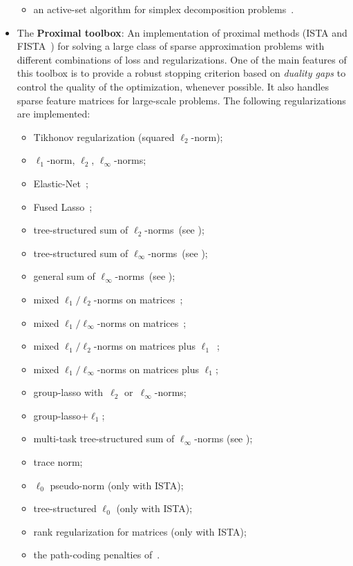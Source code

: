 \documentclass[a4paper, 11pt]{article}
\begin{document}
\begin{itemize}
\begin{itemize}
\item an active-set algorithm for simplex decomposition problems~\cite{ChenCVPR}.
\end{itemize}
\item The \textbf{Proximal toolbox}: An implementation of proximal methods
(ISTA and FISTA~\cite{beck}) for solving a large class of sparse approximation
problems with different combinations of loss and regularizations. One of the main
features of this toolbox is to provide a robust stopping criterion based on
\emph{duality gaps} to control the quality of the optimization, whenever
possible. It also handles sparse feature matrices for large-scale problems. The following regularizations are implemented:
\begin{itemize}
\item Tikhonov regularization (squared $\ell_2$-norm);
\item $\ell_1$-norm, $\ell_2$, $\ell_\infty$-norms;
\item Elastic-Net~\cite{zou};
\item Fused Lasso~\cite{tibshirani2};
\item tree-structured sum of $\ell_2$-norms~(see \cite{jenatton3,jenatton4});
\item tree-structured sum of $\ell_\infty$-norms~(see \cite{jenatton3,jenatton4});
\item general sum of $\ell_\infty$-norms~(see \cite{mairal10,mairal13});
\item mixed $\ell_1/\ell_2$-norms on matrices~\cite{yuan,obozinski};
\item mixed $\ell_1/\ell_\infty$-norms on matrices~\cite{yuan,obozinski};
\item mixed $\ell_1/\ell_2$-norms on matrices plus $\ell_1$~\cite{sprechmann,Friedman2010};
\item mixed $\ell_1/\ell_\infty$-norms on matrices plus $\ell_1$;
\item group-lasso with~$\ell_2$ or~$\ell_\infty$-norms;
\item group-lasso+$\ell_1$;
\item multi-task tree-structured sum of $\ell_\infty$-norms (see \cite{mairal10,mairal13});
\item trace norm;
\item $\ell_0$ pseudo-norm (only with ISTA);
\item tree-structured $\ell_0$ (only with ISTA);
\item rank regularization for matrices (only with ISTA);
\item the path-coding penalties of~\cite{mairal14}.

\end{itemize}
\end{itemize}
\end{document}
